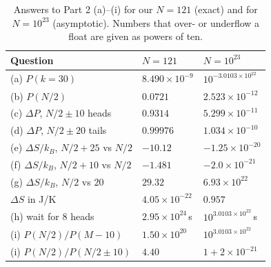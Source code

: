 \begin{table}[htbp]\centering\small
\caption{Answers to Part 2 (a)--(i) for our $N=121$ (exact) and for $N=10^{23}$ (asymptotic). Numbers that over- or underflow a float are given as powers of ten.}\label{tab:largeN}
\begin{tabular}{@{}lll@{}}
\toprule
Question & $N=121$ & $N=10^{23}$ \\
\midrule
(a) $P(k=30)$ & $8.490\times10^{-9}$ & $10^{-3.0103\times10^{22}}$ \\
(b) $P(N/2)$ & $0.0721$ & $2.523\times10^{-12}$ \\
(c) $\Delta P$, $N/2\pm10$ heads & $0.9314$ & $5.299\times10^{-11}$ \\
(d) $\Delta P$, $N/2\pm20$ tails & $0.99976$ & $1.034\times10^{-10}$ \\
(e) $\Delta S/k_B$, $N/2+25$ vs $N/2$ & $-10.12$ & $-1.25\times10^{-20}$ \\
(f) $\Delta S/k_B$, $N/2+10$ vs $N/2$ & $-1.481$ & $-2.0\times10^{-21}$ \\
(g) $\Delta S/k_B$, $N/2$ vs $20$ & $29.32$ & $6.93\times10^{22}$ \\
\phantom{(g)} $\Delta S$ in J/K & $4.05\times10^{-22}$ & $0.957$ \\
(h) wait for 8 heads & $2.95\times10^{24}$\,s & $10^{3.0103\times10^{22}}$\,s \\
(i) $P(N/2)/P(M-10)$ & $1.50\times10^{20}$ & $10^{3.0103\times10^{22}}$ \\
(i) $P(N/2)/P(N/2\pm10)$ & $4.40$ & $1+2\times10^{-21}$ \\
\bottomrule
\end{tabular}
\end{table}

